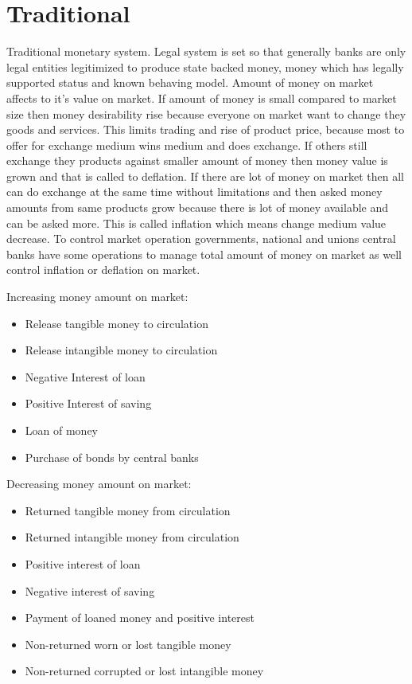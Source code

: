 \section{Traditional}
Traditional monetary system. Legal system is set so that generally banks are only legal entities legitimized to produce state backed money, money which has legally supported status and known behaving model. Amount of money on market affects to it's value on market. If amount of money is small compared to market size then money desirability rise because everyone on market want to change they goods and services. This limits trading and rise of product price, because most to offer for exchange medium wins medium and does exchange. If others still exchange they products against smaller amount of money then money value is grown and that is called to deflation. If there are lot of money on market then all can do exchange at the same time without limitations and then asked money amounts from same products grow because there is lot of money available and can be asked more. This is called inflation which means change medium value decrease. To control market operation governments, national and unions central banks have some operations to manage total amount of money on market as well control inflation or deflation on market.
\newline

Increasing money amount on market:
\begin{itemize}
\item Release tangible money to circulation
\item Release intangible money to circulation
\item Negative Interest of loan
\item Positive Interest of saving
\item Loan of money
\item Purchase of bonds by central banks
\end{itemize}

Decreasing money amount on market:
\begin{itemize}
\item Returned tangible money from circulation
\item Returned intangible money from circulation
\item Positive interest of loan
\item Negative interest of saving
\item Payment of loaned money and positive interest
\item Non-returned worn or lost tangible money
\item Non-returned corrupted or lost intangible money
\end{itemize}

